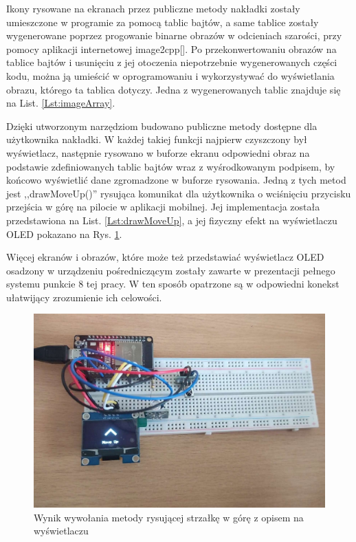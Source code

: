 \documentclass[12pt,twoside]{article}
\begin{document}


Ikony rysowane na ekranach przez publiczne metody nakładki zostały umieszczone w programie za pomocą tablic bajtów, a same tablice zostały wygenerowane poprzez progowanie binarne obrazów w odcieniach szarości, przy pomocy aplikacji internetowej image2cpp[]. Po przekonwertowaniu obrazów na tablice bajtów i usunięciu z jej otoczenia niepotrzebnie wygenerowanych części kodu, można ją umieścić w oprogramowaniu i wykorzystywać do wyświetlania obrazu, którego ta tablica dotyczy. Jedna z wygenerowanych tablic znajduje się na List. \ref*{Lst:imageArray}.



Dzięki utworzonym narzędziom budowano publiczne metody dostępne dla użytkownika nakładki. W każdej takiej funkcji najpierw czyszczony był wyświetlacz, następnie rysowano w buforze ekranu odpowiedni obraz na podstawie zdefiniowanych tablic bajtów wraz z wyśrodkowanym podpisem, by końcowo wyświetlić dane zgromadzone w buforze rysowania. Jedną z tych metod jest ,,drawMoveUp()'' rysująca komunikat dla użytkownika o wciśnięciu przycisku przejścia w górę na pilocie w aplikacji mobilnej. Jej implementacja została przedstawiona na List. \ref*{Lst:drawMoveUp}, a jej fizyczny efekt na wyświetlaczu OLED pokazano na Rys. \ref*{Fig:drawMoveUp}.



Więcej ekranów i obrazów, które może też przedstawiać wyświetlacz OLED osadzony w urządzeniu pośredniczącym zostały zawarte w prezentacji pełnego systemu punkcie 8 tej pracy. W ten sposób opatrzone są w odpowiedni konekst ułatwijący zrozumienie ich celowości.

\begin{figure}[ht]
   \centering
   \includegraphics[width=14cm]{images/drawMoveUp.jpg}
   \caption{Wynik wywołania metody rysującej strzałkę w górę z opisem na wyświetlaczu}
   \label{Fig:drawMoveUp}
\end{figure}
\end{document}
